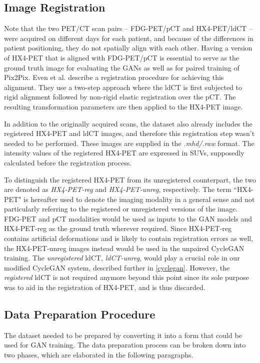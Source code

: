 \subsection{Image Registration}
Note that the two PET/CT scan pairs -- FDG-PET/pCT and HX4-PET/ldCT -- were acquired on different days for each patient, and because of the differences in patient positioning, they do not spatially align with each other. Having a version of HX4-PET that is aligned with FDG-PET/pCT is essential to serve as the ground truth image for evaluating the GANs as well as for paired training of Pix2Pix. Even et al. \cite{even2017predicting} describe a registration procedure for achieving this alignment. They use a two-step approach where the ldCT is first subjected to rigid alignment followed by non-rigid elastic registration over the pCT. The resulting transformation parameters are then applied to the HX4-PET image.

In addition to the originally acquired scans, the dataset also already includes the registered HX4-PET and ldCT images, and therefore this registration step wasn't needed to be performed. These images are supplied in the \textit{.mhd/.raw} format. The intensity values of the registered HX4-PET are expressed in SUVs, supposedly calculated before the registration process. 

To distinguish the registered HX4-PET from its unregistered counterpart, the two are denoted as \textit{HX4-PET-reg} and \textit{HX4-PET-unreg}, respectively. The term ``HX4-PET" is hereafter used to denote the imaging modality in a general sense and not particularly referring to the registered or unregistered versions of the image. FDG-PET and pCT modalities would be used as inputs to the GAN models and HX4-PET-reg as the ground truth wherever required. Since HX4-PET-reg contains artificial deformations and is likely to contain registration errors as well, the HX4-PET-unreg images instead would be used in the unpaired CycleGAN training. The \textit{unregistered} ldCT, \textit{ldCT-unreg}, would play a crucial role in our modified CycleGAN system, described further in \ref{cyclegan}. However, the \textit{registered} ldCT is not required anymore beyond this point since its sole purpose was to aid in the registration of HX4-PET, and is thus discarded.


\subsection{Data Preparation Procedure}
\label{Data_Processing}
The dataset needed to be prepared by converting it into a form that could be used for GAN training. The data preparation process can be broken down into two phases, which are elaborated in the following paragraphs. 



